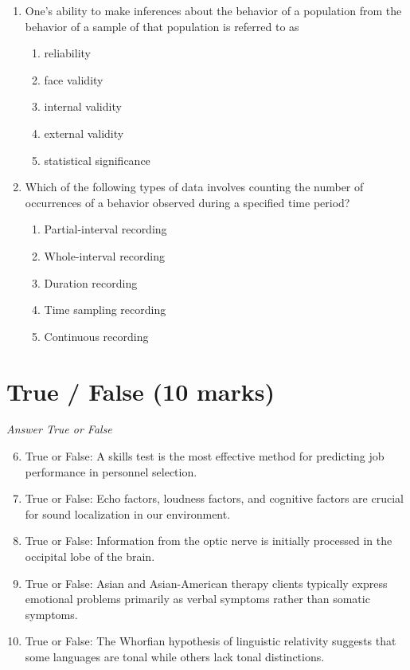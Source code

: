 \documentclass[12pt]{article}
\begin{document}
\begin{enumerate}[label=\arabic*.]
\begin{enumerate}[label=(\alph*)]
    \item Mean: 12.5 years, Median: 12, Mode: 11, Range: 10
\end{enumerate}
\item One's ability to make inferences about the behavior of a population from the behavior of a sample of that population is referred to as
\begin{enumerate}[label=(\alph*)]
    \item reliability
    \item face validity
    \item internal validity
    \item external validity
    \item statistical significance
\end{enumerate}
\item Which of the following types of data involves counting the number of occurrences of a behavior observed during a specified time period?
\begin{enumerate}[label=(\alph*)]
    \item Partial-interval recording
    \item Whole-interval recording
    \item Duration recording
    \item Time sampling recording
    \item Continuous recording
\end{enumerate}
\end{enumerate}

\section*{True / False (10 marks)}
\textit{Answer True or False}
\begin{enumerate}[label=\arabic*.]
\setcounter{enumi}{5}
\item True or False: A skills test is the most effective method for predicting job performance in personnel selection.
\item True or False: Echo factors, loudness factors, and cognitive factors are crucial for sound localization in our environment.
\item True or False: Information from the optic nerve is initially processed in the occipital lobe of the brain.
\item True or False: Asian and Asian-American therapy clients typically express emotional problems primarily as verbal symptoms rather than somatic symptoms.
\item True or False: The Whorfian hypothesis of linguistic relativity suggests that some languages are tonal while others lack tonal distinctions.
\end{enumerate}
\end{document}

